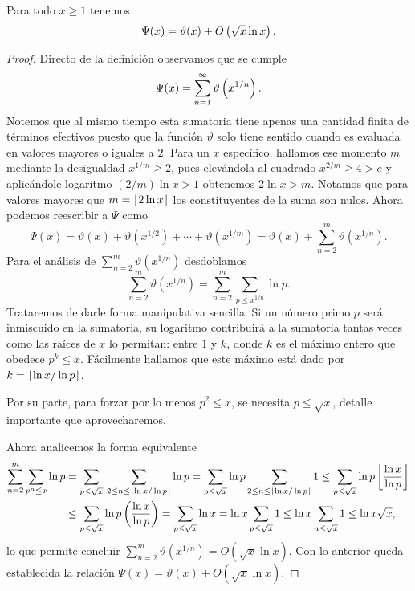 \begin{lemma}
  \label{lem:psi-is-theta-osqrtxlnx}
  Para todo \(x \geq 1\) tenemos
  \[
    \Psi(x) = \vartheta(x) + O\left( \sqrt{x}\ln x \right).
  \]
\end{lemma}

\begin{proof}
  Directo de la definici\'on observamos que se cumple 
  \[
    \Psi(x) = \sum_{n = 1}^\infty \vartheta\left( x^{1/n} \right).
  \]
  Notemos que al mismo tiempo esta sumatoria tiene apenas
  una cantidad finita de t\'erminos efectivos puesto que la funci\'on \(\vartheta\)
  solo tiene sentido cuando es evaluada en valores mayores o iguales a \(2\).
  Para un \(x\) espec\'ifico, hallamos ese momento \(m\) mediante la desigualdad
  \(x^{1/m} \geq 2\),
  pues elev\'andola al cuadrado
  \(x^{2/m} \geq 4 > e\)
  y aplic\'andole logaritmo
  \((2/m)\ln x > 1\)
  obtenemos
  \(2 \ln x > m\).
  Notamos que para valores mayores que
  \(m = \left\lfloor 2 \ln x \right\rfloor\) los constituyentes de la suma son nulos.
  Ahora podemos reescribir a \(\Psi\) como 
  \[
    \Psi(x) = \vartheta(x) + \vartheta(x^{1/2}) + \cdots + \vartheta(x^{1/m})
    = \vartheta(x) + \sum_{n = 2}^m \vartheta(x^{1/n}).
  \]
  Para el an\'alisis de \(\sum_{n = 2}^m \vartheta(x^{1/n})\) desdoblamos
  \[
    \sum_{n = 2}^m \vartheta(x^{1/n})
    = \sum_{n = 2}^m \sum_{p \leq x^{1/n}} \ln p.
  \]
  Trataremos de darle forma manipulativa sencilla.
  Si un n\'umero primo \(p\) ser\'a inmiscuido en la sumatoria,
  su logaritmo contribuir\'a a la sumatoria tantas veces como las ra\'ices de \(x\) lo permitan:
  entre \(1\) y \(k\), donde \(k\) es el m\'aximo entero que obedece \(p^k \le x\).
  F\'acilmente hallamos que este m\'aximo est\'a dado por \(k = \left\lfloor \ln x / \ln p \right\rfloor\).
  
  Por su parte, para forzar por lo menos \(p^2 \le x\),
  se necesita \(p \le \sqrt{x}\), detalle importante que aprovecharemos.
  
  Ahora analicemos la forma equivalente
  \begin{align*}
    \sum_{n = 2}^m \sum_{p^n \leq x} \ln p
    &= \sum_{p \leq \sqrt{x}} \, \sum_{2 \leq n \leq \left\lfloor \ln x / \ln p \right\rfloor} \ln p
    = \sum_{p \leq \sqrt{x}} \ln p \sum_{2 \leq n \leq \left\lfloor \ln x / \ln p \right\rfloor} 1
    \leq \sum_{p \leq \sqrt{x}} \ln p \left\lfloor \frac{\ln x}{\ln p} \right\rfloor \\
    &\leq \sum_{p \leq \sqrt{x}} \ln p \left( \frac{\ln x}{\ln p} \right)
    = \sum_{p \leq \sqrt{x}} \ln x
    = \ln x \sum_{p \leq \sqrt{x}} 1
    \leq \ln x \sum_{n \leq \sqrt{x}} 1
    \leq \ln x \sqrt{x}, 
  \end{align*}
  lo que permite concluir \(\sum_{n = 2}^m \vartheta(x^{1/n}) = O(\sqrt{x} \ln x)\).
  Con lo anterior queda establecida la relaci\'on \(\Psi(x) = \vartheta(x) + O(\sqrt{x} \ln x)\).
\end{proof}

